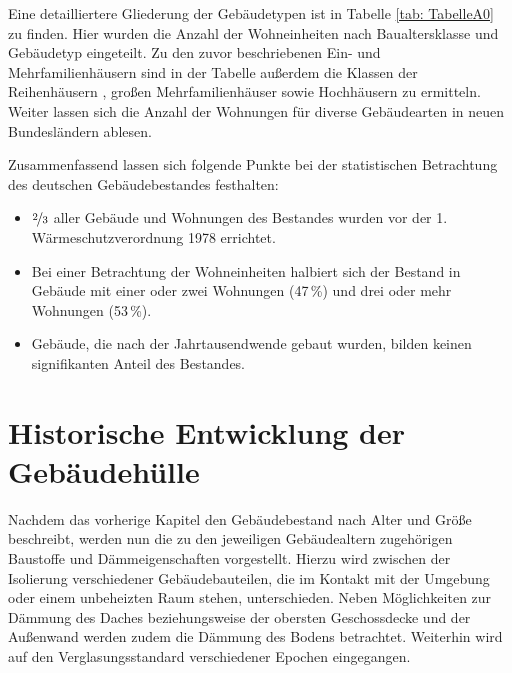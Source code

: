 Eine detailliertere Gliederung der Gebäudetypen ist in Tabelle \ref{tab: TabelleA0} zu finden. 
Hier wurden die Anzahl der Wohneinheiten nach Baualtersklasse und Gebäudetyp eingeteilt. 
Zu den zuvor beschriebenen Ein- und Mehrfamilienhäusern sind in der Tabelle außerdem die Klassen der Reihenhäusern , großen Mehrfamilienhäuser sowie Hochhäusern zu ermitteln. 
Weiter lassen sich die Anzahl der Wohnungen für diverse Gebäudearten in neuen Bundesländern ablesen.

Zusammenfassend lassen sich folgende Punkte bei der statistischen Betrachtung des deutschen Gebäudebestandes festhalten:

\begin{itemize}
	\item $\nicefrac{2}{3}$ aller Gebäude und Wohnungen des Bestandes wurden vor der 1. Wärmeschutzverordnung 1978 errichtet.
	\item Bei einer Betrachtung der Wohneinheiten halbiert sich der Bestand in Gebäude mit einer oder zwei Wohnungen (47\,\%) und drei oder mehr Wohnungen (53\,\%).
	\item Gebäude, die nach der Jahrtausendwende gebaut wurden, bilden keinen signifikanten Anteil des Bestandes.
\end{itemize}



\section{Historische Entwicklung der Gebäudehülle}
\label{sec:Sektion 22}

Nachdem das vorherige Kapitel den Gebäudebestand nach Alter und Größe beschreibt, werden nun die zu den jeweiligen Gebäudealtern zugehörigen Baustoffe und Dämmeigenschaften vorgestellt. 
Hierzu wird zwischen der Isolierung verschiedener Gebäudebauteilen, die im Kontakt mit der Umgebung oder einem unbeheizten Raum stehen, unterschieden. 
Neben Möglichkeiten zur Dämmung des Daches beziehungsweise der obersten Geschossdecke und der Außenwand werden zudem die Dämmung des Bodens betrachtet.
Weiterhin wird auf den Verglasungsstandard verschiedener Epochen eingegangen.

